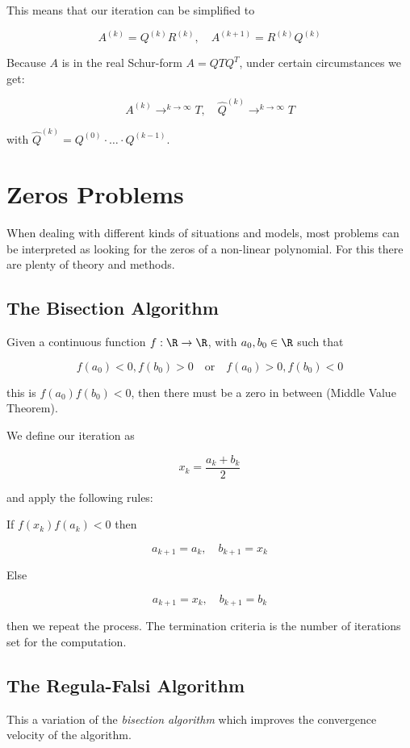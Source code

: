 This means that our iteration can be simplified to 

\[
    A^{(k)} = Q^{(k)}R^{(k)}, \quad A^{(k + 1)} =  R^{(k)} Q^{(k)} 
\]

Because \(A\) is in the real Schur-form \(A = Q T Q^T\), under certain circumstances we get: 

\[
    A^{(k)} \rightarrow^{k \to \infty} T, \quad \hat{Q}^{(k)} \rightarrow^{k \to \infty} T
\]

with \(\hat{Q}^{(k)} = Q^{(0)} \cdot \dots \cdot Q^{(k - 1)}\). 

\section{Zeros Problems}

When dealing with different kinds of situations and models, most problems can be interpreted as looking for the 
zeros of a non-linear polynomial. For this there are plenty of theory and methods.

\subsection{The Bisection Algorithm}

Given a continuous function \(f: \R \to \R\), with \(a_0, b_0 \in \R\) such that 

\[
    f(a_0) < 0, f(b_0) > 0 \quad \text{or} \quad f(a_0) > 0, f(b_0) < 0
\]

this is \(f(a_0) f(b_0) < 0\), then there must be a zero in between (Middle Value Theorem).

We define our iteration as

\[
    x_k = \frac{a_k + b_k}{2}
\]

and apply the following rules:

If \(f(x_k) f(a_k) < 0\) then 

\[
    a_{k + 1} = a_{k}, \quad b_{k + 1} = x_k
\]

Else

\[
    a_{k + 1} = x_k, \quad b_{k + 1} = b_k
\]

then we repeat the process. The termination criteria is the number of iterations set for the computation.

\subsection{The Regula-Falsi Algorithm}

This a variation of the \emph{bisection algorithm} which improves the convergence velocity of the 
algorithm. 

